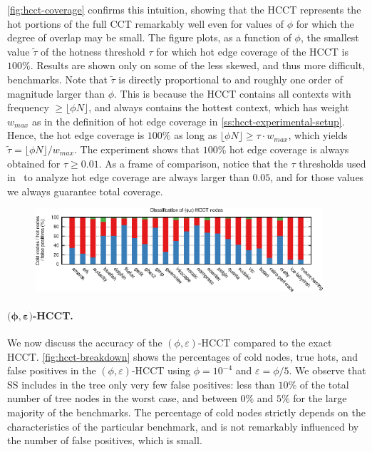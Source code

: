 \noindent \myfigure\ref{fig:hcct-coverage} confirms this intuition, showing that the HCCT represents the hot portions of the full CCT remarkably well even for values of $\phi$ for which the degree of overlap may be small. The figure plots, as a function of $\phi$, the smallest value $\widetilde\tau$ of the hotness threshold $\tau$ for which hot edge coverage of the HCCT is $100\%$. Results are shown only on some of the less skewed, and thus more difficult, benchmarks. Note that $\widetilde\tau$ is directly proportional to and roughly one order of magnitude larger than $\phi$. This is because the HCCT contains all contexts with frequency $\ge\lfloor\phi N\rfloor$, and always contains the hottest context, which has weight $w_{max}$ as in the definition of hot edge coverage in \mysection\ref{ss:hcct-experimental-setup}. Hence, the hot edge coverage is $100\%$ as long as $\lfloor\phi N\rfloor\ge\tau \cdot w_{max}$, which yields $\widetilde\tau=\lfloor\phi N\rfloor/w_{max}$. The experiment shows that $100\%$ hot edge coverage is always obtained for $\tau\ge 0.01$. As a frame of comparison, notice that the $\tau$ thresholds used in~\cite{Zhuang06} to analyze hot edge coverage are always larger than $0.05$, and for those values we always guarantee total coverage.


\ifdefined\noauthorea
\begin{figure}[!ht]
\begin{center}
\includegraphics[width=0.95\textwidth]{figures/hcct-breakdown/hcct-breakdown.eps}\\
\caption{\protect}
\end{center}
\end{figure}
\fi

\paragraph*{$\boldsymbol{(}\boldsymbol{\phi}\boldsymbol{,}\boldsymbol{\varepsilon}\boldsymbol{)}$-HCCT.} We now discuss the accuracy of the $(\phi,\varepsilon)$-HCCT compared to the exact HCCT. \myfigure\ref{fig:hcct-breakdown} shows the percentages of cold nodes, true hots, and false positives in the $(\phi,\varepsilon)$-HCCT using $\phi=10^{-4}$ and $\varepsilon=\phi/5$. We observe that SS includes in the tree only very few false positives: less than $10\%$ of the total number of tree nodes in the worst case, and between $0\%$ and $5\%$ for the large majority of the benchmarks. The percentage of cold nodes strictly depends on the characteristics of the particular benchmark, and is not remarkably influenced by the number of false positives, which is small.


